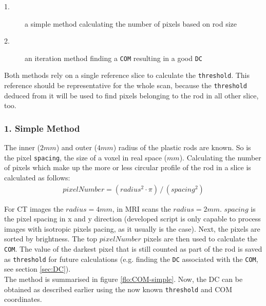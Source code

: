 \begin{description}
 \item[1.] a simple method calculating the number of pixels based on rod size
 \item[2.] an iteration method finding a \texttt{COM} resulting in a good \texttt{DC}
\end{description}

Both methods rely on a single reference slice to calculate the  \texttt{threshold}.
This reference should be representative for the whole scan, because the  \texttt{threshold} deduced from it will be used to find pixels belonging to the rod in all other slice, too.

\subsubsection{1. Simple Method}
The inner ($2mm$) and outer ($4mm$) radius of the plastic rods are known.
So is the pixel \texttt{spacing}, the size of a voxel in real space ($mm$).
Calculating the number of pixels which make up the more or less circular profile of the rod in a slice is calculated as follows:
\begin{align}
 pixelNumber = (radius^2 \cdot \pi) \, / \, (spacing^2)
\end{align}

For CT images the $radius = 4mm$, in MRI scans the $radius = 2mm$. $spacing$ is the pixel spacing in x and y direction (developed script is only capable to process images with isotropic pixels pacing, as it usually is the case).
Next, the pixels are sorted by brightness. The top $pixelNumber$ pixels are then used to calculate the \texttt{COM}.
The value of the darkest pixel that is still counted as part of the rod is saved as  \texttt{threshold} for future calculations (e.g. finding the \texttt{DC} associated with the \texttt{COM}, see section \ref{sec:DC}).\\
The method is summarised in figure \ref{flo:COM-simple}.
Now, the DC can be obtained as described earlier using the now known \texttt{threshold} and COM coordinates.

